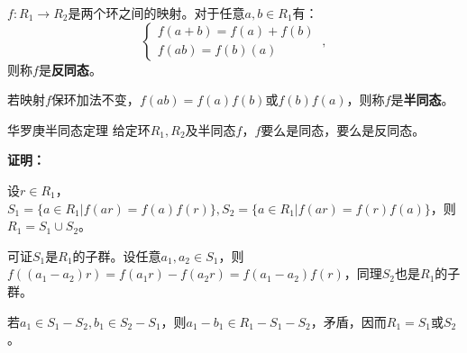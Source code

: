 
\begin{definition}{}
$f:R_1\rightarrow R_2$是两个环之间的映射。对于任意$a,b\in R_1$有：
\begin{equation}
\left\{\begin{array}{c}
f(a+b)=f(a)+f(b) \\
f(a b)=f(b) (a)
\end{array}\right.
~,\end{equation}
则称$f$是\textbf{反同态}。

若映射$f$保环加法不变，$f(ab)=f(a)f(b)$或$f(b)f(a)$，则称$f$是\textbf{半同态}。
\end{definition}
\begin{theorem}{华罗庚半同态定理}
给定环$R_1,R_2$及半同态$f$，$f$要么是同态，要么是反同态。
\end{theorem}
\textbf{证明：}

设$r\in R_1$，$S_1=\{a\in R_1|f(ar)=f(a)f(r)\},S_2=\{a\in R_1|f(ar)=f(r)f(a)\}$，则$R_1=S_1\cup S_2$。

可证$S_1$是$R_1$的子群。设任意$a_1,a_2\in S_1$，则$f((a_1-a_2)r)=f(a_1r)-f(a_2r)=f(a_1-a_2)f(r)$，同理$S_2$也是$R_1$的子群。

若$a_1\in S_1-S_2,b_1\in S_2-S_1$，则$a_1-b_1\in R_1-S_1-S_2$，矛盾，因而$R_1=S_1$或$S_2$。

